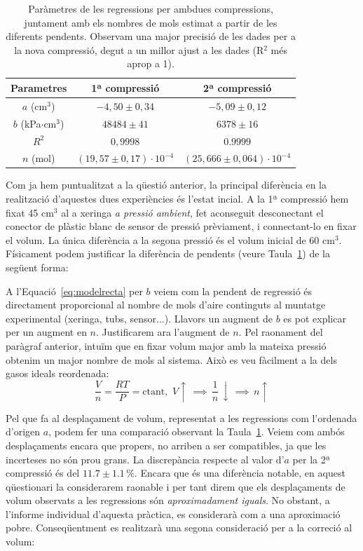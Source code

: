 \documentclass[a4paper,twoside,12pt]{article}
\theoremstyle{definition}
\begin{document}
	\begin{table}[h!]
		\centering

		\caption{Paràmetres de les regressions per ambdues compressions, juntament amb els nombres de mols estimat a partir de les diferents pendents. Observam una major precisió de les dades per a la nova compressió, degut a un millor ajust a les dades (R$^2$ més aprop a 1).}
		\begin{tabular}{|c|c|c|}
			\hline
			
			Parametres & 1ª compressió & 2ª compressió \\ \hline
			$a$ (cm$^3$) 
			& $-4,50 \pm 0,34$
			& $-5,09 \pm 0,12$ \\
			$b$ (kPa$\cdot$cm$^3$) 
			& $48484 \pm 41$
			& $6378 \pm 16$ \\
			$R^2$
			& $0,9998$
			& $0.9999$ \\
			$n$ (mol)
			& $(19,57 \pm 0,17) \cdot 10^{-4}$
			&$(25,666 \pm 0,064) \cdot 10^{-4}$\\
			\hline
		\end{tabular}
		\label{table:regressions12}
	\end{table}
	
	Com ja hem puntualitzat a la qüestió anterior, la principal diferència en la realització d'aquestes dues experiències és l'estat incial. A la 1ª compressió hem fixat 45 cm$^3$ al a xeringa \textit{a pressió ambient}, fet aconseguit desconectant el conector de plàstic blanc de sensor de pressió prèviament, i connectant-lo en fixar el volum. La única diferència a la segona pressió és el volum inicial de 60 cm$^3$. Físicament podem justificar la diferència de pendents (veure Taula~\ref{table:regressions12}) de la següent forma:
	
	\newpage
	A l'Equació~\ref{eq:modelrecta} per $b$ veiem com la pendent de regressió és directament proporcional al nombre de mols d'aire continguts al muntatge experimental (xeringa, tubs, sensor...). Llavors un augment de $b$ es pot explicar per un augment en $n$. Justificarem ara l'augment de $n$. Pel raonament del paràgraf anterior, intuïm que en fixar volum major amb la mateixa pressió obtenim un major nombre de mols al sistema. Això es veu fàcilment a la dels gasos ideals reordenada:
	$$
	\frac{V}{n} =  \frac{RT}{P} = \text{ctant}, \,\, V\uparrow \,\implies \, \frac{1}{n} \, \downarrow \, \implies \, n \uparrow
	$$
	
	Pel que fa al desplaçament de volum, representat a les regressions com l'ordenada d'origen $a$, podem fer una comparació observant la Taula~\ref{table:regressions12}. Veiem com ambós desplaçaments encara que propers, no arriben a ser compatibles, ja que les incerteses no són prou grans. La discrepància respecte al valor d'$a$ per la 2ª compressió és del $11.7\pm 1.1\, \%$. Encara que és una diferència notable, en aquest qüestionari la considerarem raonable i per tant direm que els desplaçaments de volum observats a les regressions són \textit{aproximadament iguals}. No obstant, a l'informe individual d'aquesta pràctica, es considerarà com a una aproximació pobre. Conseqüentment es realitzarà una segona consideració per a la correció al volum: 
	
\end{document}
